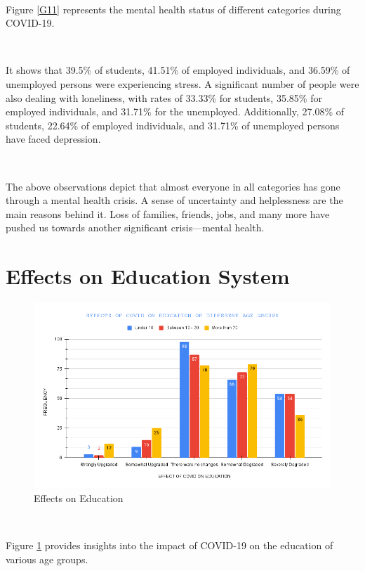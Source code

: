\ 

Figure \ref{G11} represents the mental health status of different categories during COVID-19.

\ 

It shows that 39.5\% of students, 41.51\% of employed individuals, and 36.59\% of unemployed persons were experiencing stress. A significant number of people were also dealing with loneliness, with rates of 33.33\% for students, 35.85\% for employed individuals, and 31.71\% for the unemployed. Additionally, 27.08\% of students, 22.64\% of employed individuals, and 31.71\% of unemployed persons have faced depression.

\

The above observations depict that almost everyone in all categories has gone through a mental health crisis. A sense of uncertainty and helplessness are the main reasons behind it. Loss of families, friends, jobs, and many more have pushed us towards another significant crisis—mental health.

\newpage

\section{Effects on Education System}

\begin{figure}[h!]
	\centering
	\includegraphics[width=1\linewidth]{IMAGES/Image 21.png}
	\caption{Effects on Education}
	\label{G21}
\end{figure}

\ 

Figure \ref{G21} provides insights into the impact of COVID-19 on the education of various age groups. 

\ 

